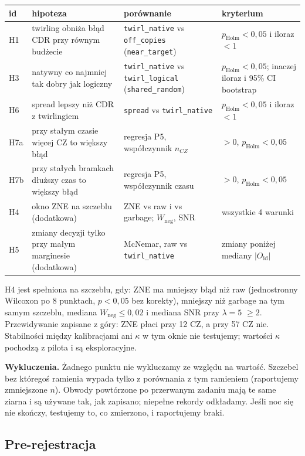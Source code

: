 \documentclass[11pt,a4paper]{article}
\newcommand{\Oid}{O_{\mathrm{id}}}
\begin{document}
\begin{center}
\small
\begin{tabular}{@{}lp{5.1cm}p{4.6cm}p{3.6cm}@{}}
\toprule
id & hipoteza & porównanie & kryterium \\
\midrule
H1 & twirling obniża błąd CDR przy równym budżecie & \texttt{twirl\_native} vs \texttt{off\_copies} (\texttt{near\_target}) & $p_{\text{Holm}}<0{,}05$ i iloraz $<1$ \\
H3 & natywny co najmniej tak dobry jak logiczny & \texttt{twirl\_native} vs \texttt{twirl\_logical} (\texttt{shared\_random}) & $p_{\text{Holm}}<0{,}05$; inaczej iloraz i 95\% CI bootstrap \\
H6 & spread lepszy niż CDR z twirlingiem & \texttt{spread} vs \texttt{twirl\_native} & $p_{\text{Holm}}<0{,}05$ i iloraz $<1$ \\
H7a & przy stałym czasie więcej CZ to większy błąd & regresja P5, współczynnik $n_{CZ}$ & $>0$, $p_{\text{Holm}}<0{,}05$ \\
H7b & przy stałych bramkach dłuższy czas to większy błąd & regresja P5, współczynnik czasu & $>0$, $p_{\text{Holm}}<0{,}05$ \\
\midrule
H4 & okno ZNE na szczeblu (dodatkowa) & ZNE vs raw i vs garbage; $W_{\text{neg}}$, SNR & wszystkie 4 warunki \\
H5 & zmiany decyzji tylko przy małym marginesie (dodatkowa) & McNemar, raw vs \texttt{twirl\_native} & zmiany poniżej mediany $|\Oid|$ \\
\bottomrule
\end{tabular}
\end{center}

H4 jest spełniona na szczeblu, gdy: ZNE ma mniejszy błąd niż raw (jednostronny Wilcoxon po 8
punktach, $p<0{,}05$ bez korekty), mniejszy niż garbage na tym samym szczeblu, mediana
$W_{\text{neg}}\le0{,}02$ i mediana SNR przy $\lambda=5$ $\ge2$. Przewidywanie zapisane z góry: ZNE
płaci przy 12 CZ, a przy 57 CZ nie. Stabilności między kalibracjami ani $\kappa$ w tym oknie nie
testujemy; wartości $\kappa$ pochodzą z pilota i są eksploracyjne.

\textbf{Wykluczenia.} Żadnego punktu nie wykluczamy ze względu na wartość. Szczebel bez któregoś
ramienia wypada tylko z porównania z tym ramieniem (raportujemy zmniejszone $n$). Obwody
powtórzone po przerwanym zadaniu mają te same ziarna i są używane tak, jak zapisano; niepełne
rekordy odkładamy. Jeśli noc się nie skończy, testujemy to, co zmierzono, i raportujemy braki.

\subsection{Pre-rejestracja}
\end{document}
